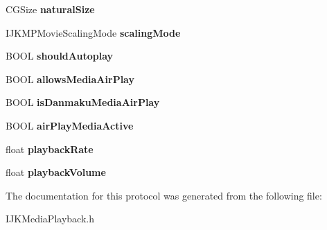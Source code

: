 \begin{DoxyCompactItemize}
\item 
\mbox{\label{protocol_i_j_k_media_playback_01-p_a6c77c9d7c4ff98f8e9f02b8de0bdcf6f}} 
C\+G\+Size {\bfseries natural\+Size}
\item 
\mbox{\label{protocol_i_j_k_media_playback_01-p_abb32f282e57276d2659c50ad40552fb7}} 
I\+J\+K\+M\+P\+Movie\+Scaling\+Mode {\bfseries scaling\+Mode}
\item 
\mbox{\label{protocol_i_j_k_media_playback_01-p_a70a9bad5e0e00a8d467c05f1bd876ca1}} 
B\+O\+OL {\bfseries should\+Autoplay}
\item 
\mbox{\label{protocol_i_j_k_media_playback_01-p_ac8405ac042bbdf06b85e4cbf845b7b55}} 
B\+O\+OL {\bfseries allows\+Media\+Air\+Play}
\item 
\mbox{\label{protocol_i_j_k_media_playback_01-p_abf2723f068b04a32eff5511827184d39}} 
B\+O\+OL {\bfseries is\+Danmaku\+Media\+Air\+Play}
\item 
\mbox{\label{protocol_i_j_k_media_playback_01-p_ac75a338858a3763465cbbc9c60fd8c57}} 
B\+O\+OL {\bfseries air\+Play\+Media\+Active}
\item 
\mbox{\label{protocol_i_j_k_media_playback_01-p_a835ad839e3fadfdec7c1ed3ce6cd74c1}} 
float {\bfseries playback\+Rate}
\item 
\mbox{\label{protocol_i_j_k_media_playback_01-p_a38de13f96b636f26183ce8b4abc45f16}} 
float {\bfseries playback\+Volume}
\end{DoxyCompactItemize}


The documentation for this protocol was generated from the following file\+:\begin{DoxyCompactItemize}
\item 
I\+J\+K\+Media\+Playback.\+h\end{DoxyCompactItemize}
